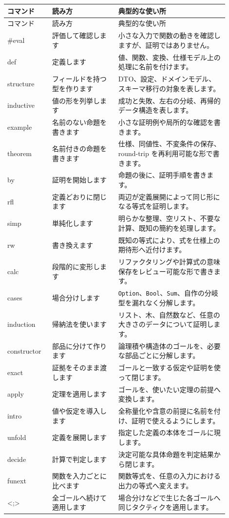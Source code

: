 \begin{longtable}{>{\ttfamily}p{0.18\linewidth}p{0.27\linewidth}p{0.45\linewidth}}
\toprule
\normalfont コマンド & \normalfont 読み方 & \normalfont 典型的な使い所 \\
\midrule
\endfirsthead
\toprule
\normalfont コマンド & \normalfont 読み方 & \normalfont 典型的な使い所 \\
\midrule
\endhead
\#eval & 評価して確認します & 小さな入力で関数の動きを確認しますが、証明ではありません。 \\
def & 定義します & 値、関数、変換、仕様モデル上の処理に名前を付けます。 \\
structure & フィールドを持つ型を作ります & DTO、設定、ドメインモデル、スキーマ移行の対象を表します。 \\
inductive & 値の形を列挙します & 成功と失敗、左右の分岐、再帰的データ構造を表します。 \\
example & 名前のない命題を書きます & 小さな証明例や局所的な確認を書きます。 \\
theorem & 名前付きの命題を書きます & 仕様、同値性、不変条件の保存、round-trip を再利用可能な形で書きます。 \\
by & 証明を開始します & 命題の後に、証明手順を書きます。 \\
rfl & 定義どおりに閉じます & 両辺が定義展開によって同じ形になる等式を証明します。 \\
simp & 単純化します & 明らかな整理、空リスト、不要な計算、既知の簡約を処理します。 \\
rw & 書き換えます & 既知の等式により、式を仕様上の期待形へ近付けます。 \\
calc & 段階的に変形します & リファクタリングや計算式の意味保存をレビュー可能な形で書きます。 \\
cases & 場合分けします & \texttt{Option}、\texttt{Bool}、\texttt{Sum}、自作の分岐型を漏れなく分解します。 \\
induction & 帰納法を使います & リスト、木、自然数など、任意の大きさのデータについて証明します。 \\
constructor & 部品に分けて作ります & 論理積や構造体のゴールを、必要な部品ごとに分解します。 \\
exact & 証拠をそのまま渡します & ゴールと一致する仮定や証明を使って閉じます。 \\
apply & 定理を適用します & ゴールを、使いたい定理の前提へ変換します。 \\
intro & 値や仮定を導入します & 全称量化や含意の前提に名前を付け、証明で使えるようにします。 \\
unfold & 定義を展開します & 指定した定義の本体をゴールに現します。 \\
decide & 計算で判定します & 決定可能な具体命題を判定結果から閉じます。 \\
funext & 関数を入力ごとに比べます & 関数等式を、任意の入力における出力の等式へ変えます。 \\
<;> & 全ゴールへ続けて適用します & 場合分けなどで生じた各ゴールへ同じタクティクを適用します。 \\
\bottomrule
\end{longtable}

